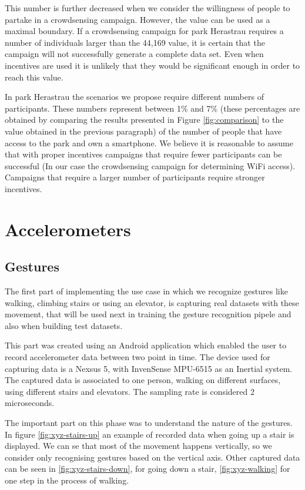 This number is further decreased when we consider the willingness of people to partake in a crowdsensing campaign. However, the value can be used as a maximal boundary. If a crowdsensing campaign for park Herastrau requires a number of individuals larger than the 44,169 value, it is certain that the campaign will not successfully generate a complete data set. Even when incentives are used it is unlikely that they would be significant enough in order to reach this value.

In park Herastrau the scenarios we propose require different numbers of participants. These numbers represent between 1\% and 7\% (these percentages are obtained by comparing the results presented in Figure \ref{fig:comparison} to the value obtained in the previous paragraph) of the number of people that have access to the park and own a smartphone. We believe it is reasonable to assume that with proper incentives campaigns that require fewer participants can be successful (In our case the crowdsensing campaign for determining WiFi access). Campaigns that require a larger number of participants require stronger incentives.

\section{Accelerometers}
\label{sec:res-acc}

\subsection{Gestures}
The first part of implementing the use case in which we recognize gestures like walking, climbing stairs or using an elevator, is capturing real datasets with these movement, that will be used next in training the gesture recognition pipele and also when building test datasets.

This part was created using an Android application which enabled the user to record accelerometer data between two point in time. The device used for capturing data is a Nexsus 5, with InvenSense MPU-6515 as an Inertial system. The captured data is associated to one person, walking on different surfaces, using different stairs and elevators. The sampling rate is considered 2 microseconds.

The important part on this phase was to understand the nature of the gestures. In figure \ref{fig:xyz-stairs-up} an example of recorded data when going up a stair is displayed. We can se that most of the movement happens vertically, so we consider only recognising gestures based on the vertical axis. Other captured data can be seen in \ref{fig:xyz-stairs-down}, for going down a stair, \ref{fig:xyz-walking} for one step in the process of walking.

